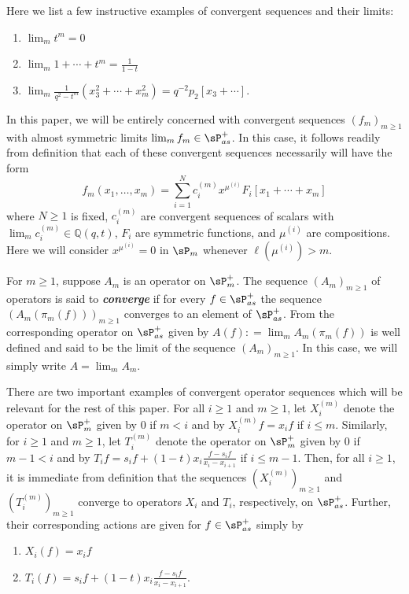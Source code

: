 Here we list a few instructive examples of convergent sequences and their limits:

\begin{enumerate}
    \item $\lim_{m} t^m = 0$
    \item $\lim_{m} 1+\cdots +t^m = \frac{1}{1-t}$
    \item $\lim_{m} \frac{1}{q^2-t^m}(x_3^2 +\cdots+ x_{m}^2 ) = q^{-2} p_2[x_3+ \cdots].$
\end{enumerate}

\begin{rema}\label{useful defn of convergence}
    In this paper, we will be entirely concerned with convergent sequences $(f_m)_{m \geq 1}$ with almost symmetric limits $\lim_{m} f_m \in \sP_{as}^{+}$. In this case, it follows readily from definition that each of these convergent sequences necessarily will have the form 
    $$f_m(x_1,\ldots,x_m) = \sum_{i=1}^{N} c_i^{(m)}x^{\mu^{(i)}}F_i[x_1+\cdots + x_m]$$
    where $N \geq 1$ is fixed, $c_i^{(m)}$ are convergent sequences of scalars with $\lim_{m} c_i^{(m)} \in \mathbb{Q}(q,t)$, $F_i$ are symmetric functions, and $\mu^{(i)}$ are compositions. Here we will consider $x^{\mu^{(i)}} = 0$ in $\sP_{m}$ whenever $\ell(\mu^{(i)}) > m$.
\end{rema}

\begin{defi}
    For $m \geq 1$, suppose $A_m$ is an operator on $\sP_m^{+}$. The sequence $(A_m)_{m \geq 1}$ of operators is said to \textbf{\textit{converge}} if for every $f \in \sP_{as}^{+}$ the sequence $(A_m(\pi_m(f)))_{m \geq 1}$ converges to an element of $\sP_{as}^{+}$. From \cite{Ion_2022} the corresponding operator on $\sP_{as}^{+}$ given by $A(f): = \lim_{m} A_m(\pi_m(f))$ is well defined and said to be the limit of the sequence $(A_m)_{m \geq 1}$. In this case, we will simply write $A = \lim_{m} A_m$.
\end{defi}

There are two important examples of convergent operator sequences which will be relevant for the rest of this paper. For all $i 
\geq 1$ and $m \geq 1$, let $X_i^{(m)}$ denote the operator on $\sP_m^{+}$ given by $0$ if $m < i$ and by $X_i^{(m)}f = x_i f$ if $i \leq m$. Similarly, for $i \geq 1$ and $m \geq 1$, let $T_i^{(m)}$ denote the operator on $\sP_m^{+}$ given by $0$ if $m-1 < i$ and by $T_if = s_if + (1-t)x_i \frac{f-s_if}{x_i-x_{i+1}}$ if $i \leq m-1$. Then, for all $i \geq 1$, it is immediate from definition that the sequences $(X_i^{(m)})_{m \geq 1}$ and $(T_i^{(m)})_{m \geq 1}$ converge to operators $X_i$ and $T_i$, respectively, on $\sP_{as}^{+}$. Further, their corresponding actions are given for $f \in \sP_{as}^{+}$ simply by 
\begin{enumerate}
    \item $X_i(f) = x_if$
    \item $T_i(f) = s_if + (1-t)x_i \frac{f-s_if}{x_i-x_{i+1}}.$ 
\end{enumerate}

